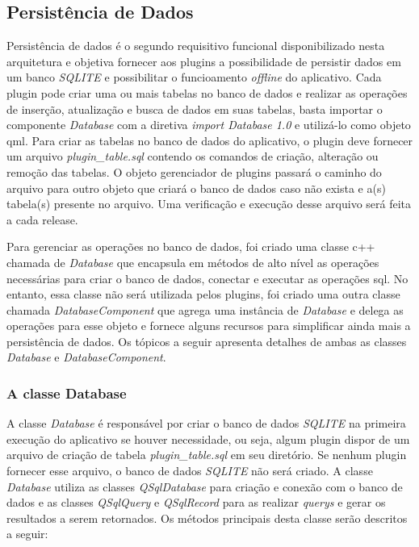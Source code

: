 \subsection{Persistência de Dados}\label{sec:solucao-desenvolvida}
Persistência de dados é o segundo requisitivo funcional disponibilizado nesta arquitetura e objetiva fornecer aos plugins a possibilidade de persistir dados em um banco \textit{SQLITE} e possibilitar o funcioamento \textit{offline} do aplicativo. Cada plugin pode criar uma ou mais tabelas no banco de dados e realizar as operações de inserção, atualização e busca de dados em suas tabelas, basta importar o componente \textit{Database} com a diretiva \textit{import Database 1.0} e utilizá-lo como objeto qml. Para criar as tabelas no banco de dados do aplicativo, o plugin deve fornecer um arquivo \textit{plugin\_table.sql} contendo os comandos de criação, alteração ou remoção das tabelas. O objeto gerenciador de plugins passará o caminho do arquivo para outro objeto que criará o banco de dados caso não exista e a(s) tabela(s) presente no arquivo. Uma verificação e execução desse arquivo será feita a cada release.\par

Para gerenciar as operações no banco de dados, foi criado uma classe c++ chamada de \textit{Database} que encapsula em métodos de alto nível as operações necessárias para criar o banco de dados, conectar e executar as operações sql. No entanto, essa classe não será utilizada pelos plugins, foi criado uma outra classe chamada \textit{DatabaseComponent} que agrega uma instância de \textit{Database} e delega as operações para esse objeto e fornece alguns recursos para simplificar ainda mais a persistência de dados. Os tópicos a seguir apresenta detalhes de ambas as classes \textit{Database} e \textit{DatabaseComponent}.

\subsubsection{A classe Database}\label{sec:solucao-desenvolvida}
A classe \textit{Database} é responsável por criar o banco de dados \textit{SQLITE} na primeira execução do aplicativo se houver necessidade, ou seja, algum plugin dispor de um arquivo de criação de tabela \textit{plugin\_table.sql} em seu diretório. Se nenhum plugin fornecer esse arquivo, o banco de dados \textit{SQLITE} não será criado. A classe \textit{Database} utiliza as classes \textit{QSqlDatabase} para criação e conexão com o banco de dados e as classes \textit{QSqlQuery} e \textit{QSqlRecord} para as realizar \textit{querys} e gerar os resultados a serem retornados. Os métodos principais desta classe serão descritos a seguir:

